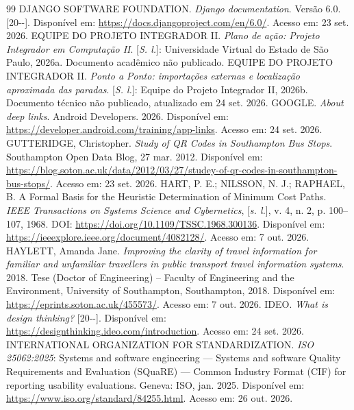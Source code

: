 \documentclass[12pt,oneside,a4paper,brazil,chapter=TITLE]{abntex2}
\begin{document}
\begin{thebibliography}{99}
 DJANGO SOFTWARE FOUNDATION. \textit{Django documentation}. Versão 6.0. [20\mbox{-}\mbox{-}]. Disponível em: \url{https://docs.djangoproject.com/en/6.0/}. Acesso em: 23 set. 2026.
 EQUIPE DO PROJETO INTEGRADOR II. \textit{Plano de ação: Projeto Integrador em Computação II}. [\textit{S. l.}]: Universidade Virtual do Estado de São Paulo, 2026a. Documento acadêmico não publicado.
 EQUIPE DO PROJETO INTEGRADOR II. \textit{Ponto a Ponto: importações externas e localização aproximada das paradas}. [\textit{S. l.}]: Equipe do Projeto Integrador II, 2026b. Documento técnico não publicado, atualizado em 24 set. 2026.
 GOOGLE. \textit{About deep links}. Android Developers. 2026. Disponível em: \url{https://developer.android.com/training/app-links}. Acesso em: 24 set. 2026.
 GUTTERIDGE, Christopher. \textit{Study of QR Codes in Southampton Bus Stops}. Southampton Open Data Blog, 27 mar. 2012. Disponível em: \url{https://blog.soton.ac.uk/data/2012/03/27/studey-of-qr-codes-in-southampton-bus-stops/}. Acesso em: 23 set. 2026.
 HART, P. E.; NILSSON, N. J.; RAPHAEL, B. A Formal Basis for the Heuristic Determination of Minimum Cost Paths. \textit{IEEE Transactions on Systems Science and Cybernetics}, [\textit{s. l.}], v. 4, n. 2, p. 100--107, 1968. DOI: \url{https://doi.org/10.1109/TSSC.1968.300136}. Disponível em: \url{https://ieeexplore.ieee.org/document/4082128/}. Acesso em: 7 out. 2026.
 HAYLETT, Amanda Jane. \textit{Improving the clarity of travel information for familiar and unfamiliar travellers in public transport travel information systems}. 2018. Tese (Doctor of Engineering) -- Faculty of Engineering and the Environment, University of Southampton, Southampton, 2018. Disponível em: \url{https://eprints.soton.ac.uk/455573/}. Acesso em: 7 out. 2026.
 IDEO. \textit{What is design thinking?} [20\mbox{-}\mbox{-}]. Disponível em: \url{https://designthinking.ideo.com/introduction}. Acesso em: 24 set. 2026.
 INTERNATIONAL ORGANIZATION FOR STANDARDIZATION. \textit{ISO 25062:2025}: Systems and software engineering --- Systems and software Quality Requirements and Evaluation (SQuaRE) --- Common Industry Format (CIF) for reporting usability evaluations. Geneva: ISO, jan. 2025. Disponível em: \url{https://www.iso.org/standard/84255.html}. Acesso em: 26 out. 2026.

\end{thebibliography}
\end{document}
